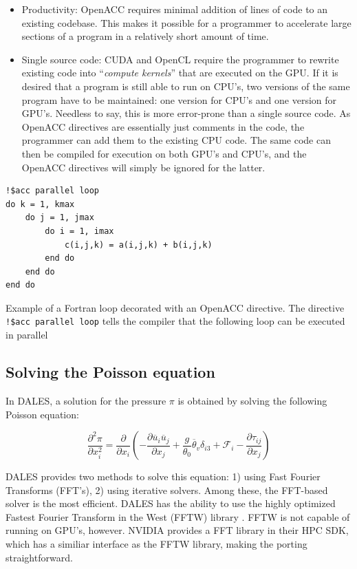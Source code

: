 \begin{itemize}
    \item Productivity: OpenACC requires minimal addition of lines of code to an existing codebase. This makes it possible for a programmer to accelerate large sections of a program in a relatively short amount of time. 
    \item Single source code: CUDA and OpenCL require the programmer to rewrite existing code into ``\emph{compute kernels}'' that are executed on the GPU. If it is desired that a program is still able to run on CPU's, two versions of the same program have to be maintained: one version for CPU's and one version for GPU's. Needless to say, this is more error-prone than a single source code. As OpenACC directives are essentially just comments in the code, the programmer can add them to the existing CPU code. The same code can then be compiled for execution on both GPU's and CPU's, and the OpenACC directives will simply be ignored for the latter.
\end{itemize}

\begin{listing}[H]
\begin{verbatim}
!$acc parallel loop
do k = 1, kmax
    do j = 1, jmax
        do i = 1, imax
            c(i,j,k) = a(i,j,k) + b(i,j,k)
        end do
    end do
end do
\end{verbatim}
\caption{Example of a Fortran loop decorated with an OpenACC directive. The directive \texttt{!\$acc parallel loop} tells the compiler that the following loop can be executed in parallel}
\label{listing:accloop}
\end{listing}

\subsection{Solving the Poisson equation}

In DALES, a solution for the pressure $\pi$ is obtained by solving the following Poisson equation:

\begin{equation}
    \frac{\partial^2 \pi}{\partial x_i^2} = \frac{\partial }{\partial x_i} \left( - \frac{\partial \overline{u}_i \overline{u}_j}{\partial x_j} + \frac{g}{\theta_0}\overline{\theta}_v\delta_{i3} + \mathcal{F}_i - \frac{\partial \tau_{ij}}{\partial x_j} \right) \label{eq:pressure}
\end{equation}

 DALES provides two methods to solve this equation: 1) using Fast Fourier Transforms (FFT's), 2) using iterative solvers. Among these, the FFT-based solver is the most efficient. DALES has the ability to use the highly optimized Fastest Fourier Transform in the West (FFTW) library \citep{FFTW97}. FFTW is not capable of running on GPU's, however. NVIDIA provides a FFT library in their HPC SDK, which has a similiar interface as the FFTW library, making the porting straightforward. 

